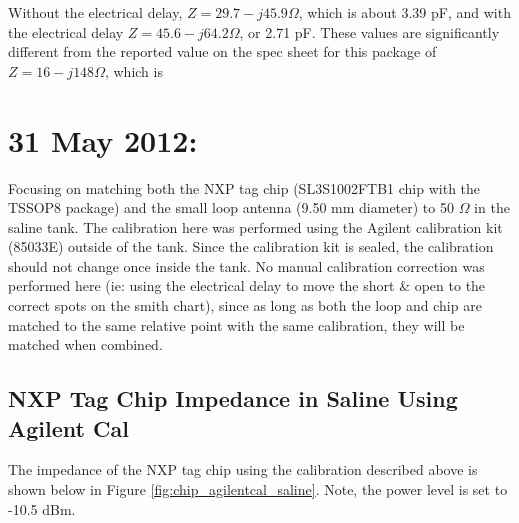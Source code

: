 \documentclass[12pt,onecolumn,titlepage]{article}
\begin{document}
Without the electrical delay, $Z=29.7-j45.9\Omega$, which is about 3.39 pF, and with the electrical delay $Z=45.6-j64.2\Omega$, or 2.71 pF. These values are significantly different from the reported value on the spec sheet for this package of $Z=16-j148\Omega$, which is 




\clearpage
\section{31 May 2012:}



\indent \indent Focusing on matching both the NXP tag chip (SL3S1002FTB1 chip with the TSSOP8 package) and the small loop antenna (9.50 mm diameter) to 50 $\Omega$ in the saline tank. The calibration here was performed using the Agilent calibration kit (85033E) outside of the tank. Since the calibration kit is sealed, the calibration should not change once inside the tank. No manual calibration correction was performed here (ie: using the electrical delay to move the short \& open to the correct spots on the smith chart), since as long as both the loop and chip are matched to the same relative point with the same calibration, they will be matched when combined. 

\subsection{NXP Tag Chip Impedance in Saline Using Agilent Cal}
\indent \indent The impedance of the NXP tag chip using the calibration described above is shown below in Figure \ref{fig:chip_agilentcal_saline}. Note, the power level is set to -10.5 dBm.
\end{document}
